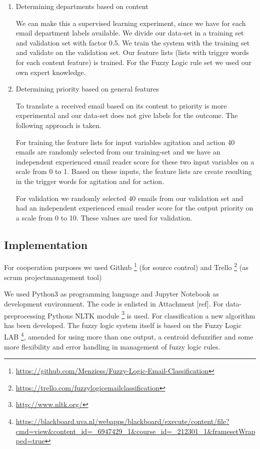 \documentclass[journal]{IEEEtran}
\begin{document}
\begin{enumerate}
    \item{Determining departments based on content}

    We can make this a supervised learning experiment, since we have for each email department labels available. We divide our data-set in a training set and validation set with factor 0.5. We train the system with the training set and validate on the validation set. Our feature lists (lists with trigger words for each content feature) is trained. For the Fuzzy Logic rule set we used our own expert knowledge.

    \item{Determining priority based on general features}

    To translate a received email based on its content to priority is more experimental and our data-set does not give labels for the outcome. The following approach is taken.

    For training the feature lists for input variables agitation and action 40 emails are randomly selected from our training-set and we have an independent experienced email reader score for these two input variables on a scale from 0 to 1. Based on these inputs, the feature lists are create resulting in the trigger words for agitation and for action.

    For validation we randomly selected 40 emails from our validation set and had an independent experienced email reader score for the output priority on a scale from 0 to 10. These values are used for validation.

\end{enumerate}

\subsection{Implementation}

For cooperation purposes we used Github \footnote{\url{https://github.com/Menziess/Fuzzy-Logic-Email-Classification}} (for source control) and Trello \footnote{\url{https://trello.com/fuzzylogicemailclassification}} (as scrum projectmanagement tool)

We used Python3 as programming language and Jupyter Notebook as development
environment. The code is enlisted in Attachment [ref]. For data-preprocessing Pythons NLTK module \footnote{\url{http://www.nltk.org/}} is used. For classification a new algorithm has been developed. The fuzzy logic system itself is based on the Fuzzy Logic LAB \footnote{\url{https://blackboard.uva.nl/webapps/blackboard/execute/content/file?cmd=view&content_id=_6947429_1&course_id=_212301_1&framesetWrapped=true}}, amended for using more than one output, a centroid defuzzifier and some more flexibility and error handling in management of fuzzy logic rules.
\end{document}
